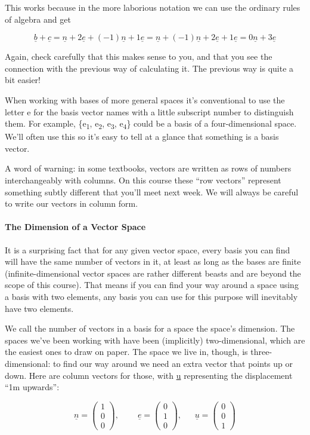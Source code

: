 \documentclass[oneside,english]{amsbook}
\numberwithin{section}{chapter}
\theoremstyle{plain}
\theoremstyle{definition}
\begin{document}
This works because in the more laborious notation we can use the
ordinary rules of algebra and get

\[\underline{b} + \underline{c} = \underline{n} + 2\underline{e} + ( - 1)\underline{n} + 1\underline{e} = \underline{n} + ( - 1)\underline{n} + 2\underline{e} + 1\underline{e} = 0\underline{n} + 3\underline{e}\]

Again, check carefully that this makes sense to you, and that you see
the connection with the previous way of calculating it. The previous way
is quite a bit easier!

When working with bases of more general spaces it's conventional to use
the letter e for the basis vector names with a little subscript number
to distinguish them. For example, \{e\textsubscript{1},
e\textsubscript{2}, e\textsubscript{3}, e\textsubscript{4}\} could be a
basis of a four-dimensional space. We'll often use this so it's easy to
tell at a glance that something is a basis vector.

A word of warning: in some textbooks, vectors are written as rows of
numbers interchangeably with columns. On this course these ``row
vectors'' represent something subtly different that you'll meet next
week. We will always be careful to write our vectors in column form.

\paragraph{The Dimension of a Vector Space}

It is a surprising fact that for any given vector space, every basis you
can find will have the same number of vectors in it, at least as long as
the bases are finite (infinite-dimensional vector spaces are rather
different beasts and are beyond the scope of this course). That means if
you can find your way around a space using a basis with two elements,
any basis you can use for this purpose will inevitably have two
elements.

We call the number of vectors in a basis for a space the space's
dimension. The spaces we've been working with have been (implicitly)
two-dimensional, which are the easiest ones to draw on paper. The space
we live in, though, is three-dimensional: to find our way around we need
an extra vector that points up or down. Here are column vectors for
those, with \ul{u} representing the displacement ``1m upwards'':

\[\underline{n} = \begin{pmatrix}
	1 \\
	0 \\
	0
\end{pmatrix},\ \ \ \ \ \ \ \ \ \ \underline{e} = \begin{pmatrix}
	0 \\
	1 \\
	0
\end{pmatrix},\ \ \ \ \ \ \ \underline{u} = \begin{pmatrix}
	0 \\
	0 \\
	1
\end{pmatrix}\]
\end{document}
